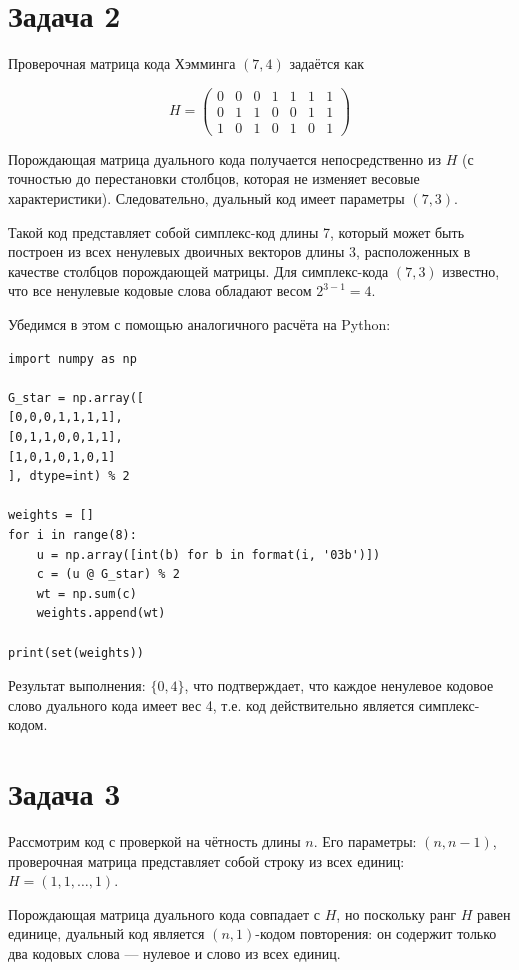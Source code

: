 \documentclass{article}
\begin{document}
\section{Задача 2}

Проверочная матрица кода Хэмминга $(7,4)$ задаётся как

\[
H = \begin{pmatrix}
0 & 0 & 0 & 1 & 1 & 1 & 1 \\
0 & 1 & 1 & 0 & 0 & 1 & 1 \\
1 & 0 & 1 & 0 & 1 & 0 & 1
\end{pmatrix}
\]

Порождающая матрица дуального кода получается непосредственно из $H$ (с точностью до перестановки столбцов, которая не изменяет весовые характеристики). Следовательно, дуальный код имеет параметры $(7,3)$.

Такой код представляет собой симплекс-код длины 7, который может быть построен из всех ненулевых двоичных векторов длины 3, расположенных в качестве столбцов порождающей матрицы. Для симплекс-кода $(7,3)$ известно, что все ненулевые кодовые слова обладают весом $2^{3-1} = 4$.

Убедимся в этом с помощью аналогичного расчёта на Python:

\begin{verbatim}
import numpy as np

G_star = np.array([
[0,0,0,1,1,1,1],
[0,1,1,0,0,1,1],
[1,0,1,0,1,0,1]
], dtype=int) % 2

weights = []
for i in range(8):
    u = np.array([int(b) for b in format(i, '03b')])
    c = (u @ G_star) % 2
    wt = np.sum(c)
    weights.append(wt)

print(set(weights))
\end{verbatim}

Результат выполнения: $\{0, 4\}$, что подтверждает, что каждое ненулевое кодовое слово дуального кода имеет вес 4, т.е. код действительно является симплекс-кодом.

\section{Задача 3}

Рассмотрим код с проверкой на чётность длины $n$. Его параметры: $(n, n-1)$, проверочная матрица представляет собой строку из всех единиц: $H = (1, 1, \dots, 1)$.

Порождающая матрица дуального кода совпадает с $H$, но поскольку ранг $H$ равен единице, дуальный код является $(n, 1)$-кодом повторения: он содержит только два кодовых слова — нулевое и слово из всех единиц.
\end{document}
